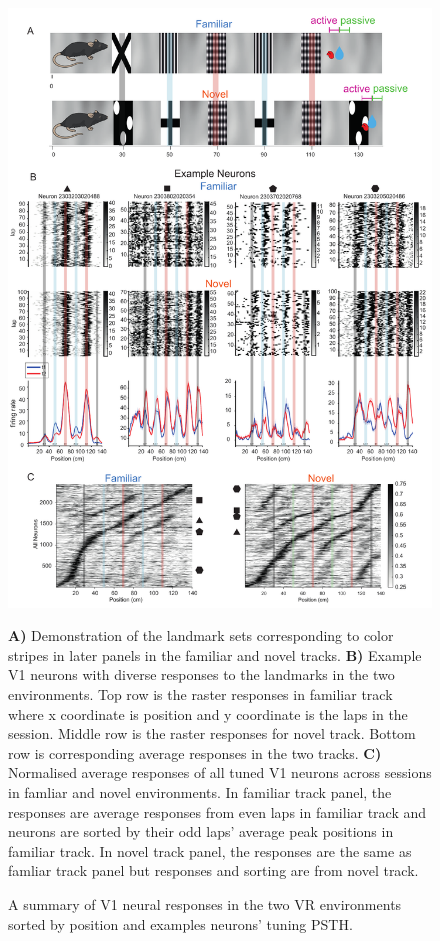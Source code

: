 \begin{figure}
    \centering
    \includegraphics[width=1\linewidth]{figures//Chapter 4 V1/fig1_VR_setup_and_responses.pdf}
    \caption{A summary of V1 neural responses in the two VR environments sorted by position and examples neurons' tuning PSTH.}
\medskip
\small
\textbf{A)} Demonstration of the landmark sets corresponding to color stripes in later panels in the familiar and novel tracks. \textbf{B)} Example V1 neurons with diverse responses to the landmarks in the two environments. Top row is the raster responses in familiar track where x coordinate is position and y coordinate is the laps in the session. Middle row is the raster responses for novel track. Bottom row is corresponding average responses in the two tracks. \textbf{C)} Normalised average responses of all tuned V1 neurons across sessions in famliar and novel environments. In familiar track panel, the responses are average responses from even laps in familiar track and neurons are sorted by their odd laps' average peak positions in familiar track. In novel track panel, the responses are the same as famliar track panel but responses and sorting are from novel track.

    \label{fig:population map}
    
\end{figure}



